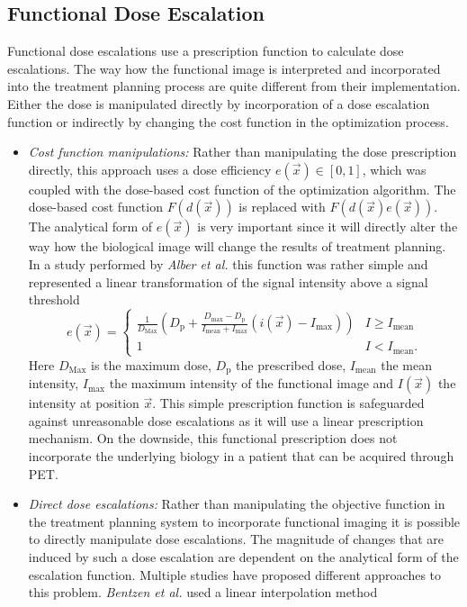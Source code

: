 \subsection{Functional Dose Escalation}
Functional dose escalations use a prescription function to calculate dose escalations. The way how the functional image is interpreted and incorporated into the treatment planning process are quite different from their implementation. Either the dose is manipulated directly by incorporation of a dose escalation function or indirectly by changing the cost function in the optimization process.
\begin{itemize}
\item \textit{Cost function manipulations:} Rather than manipulating the dose prescription directly, this approach uses a dose efficiency $e(\vec x)\in[0,1]$, which was coupled with the dose-based cost function of the optimization algorithm. The dose-based cost function $F(d(\vec x))$ is replaced with $F(d(\vec x)e(\vec x))$. The analytical form of $e(\vec x)$ is very important since it will directly alter the way how the biological image will change the results of treatment planning. In a study performed by \textit{Alber et al.} \cite{pmid12587912} this function was rather simple and represented a linear transformation of the signal intensity above a signal threshold
\begin{equation}\label{eq:alber}
e(\vec x) = 
\begin{cases}
\frac{1}{D_{\mathrm{Max}}}\left(D_{\mathrm{p}} +\frac{D_{\mathrm{max}}-D_{\mathrm{p}}}{I_{\mathrm{mean}}+I_{\mathrm{max}}}(i(\vec x)-I_{\mathrm{max}})\right) & I\geq I_{\mathrm{mean}}\\
1 & I< I_{\mathrm{mean}}.
\end{cases}
\end{equation}
Here $D_{\mathrm{Max}}$ is the maximum dose, $D_{\mathrm{p}}$ the prescribed dose, $I_{\mathrm{mean}}$ the mean intensity, $I_{\mathrm{max}}$  the maximum intensity of the functional image and $I(\vec x)$ the intensity at position $\vec x$. This simple prescription function is safeguarded against unreasonable dose escalations as it will use a linear prescription mechanism. On the downside, this functional prescription does not incorporate the underlying biology in a patient that can be acquired through PET.
\item \textit{Direct dose escalations: }Rather than manipulating the objective function in the treatment planning system to incorporate functional imaging it is possible to directly manipulate dose escalations. The magnitude of changes that are induced by such a dose escalation are dependent on the analytical form of the escalation function. Multiple studies have proposed different approaches to this problem. \textit{Bentzen et al.}\cite{pmid21356478} used a linear interpolation method

\end{itemize}

